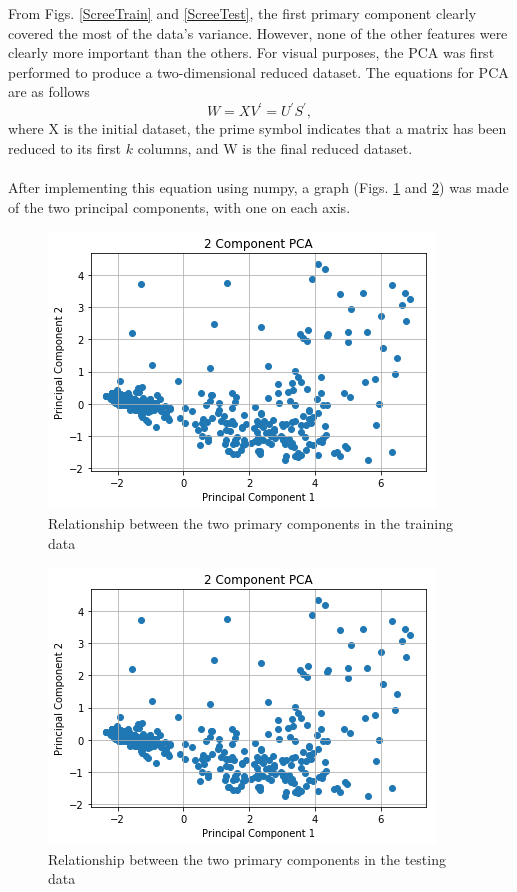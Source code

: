 \documentclass[12pt]{article}
\begin{document}
    From Figs. \ref{ScreeTrain} and \ref{ScreeTest}, the first primary component clearly covered the most of the data's variance. However, none of the other features were clearly more important than the others. For visual purposes, the PCA was first performed to produce a two-dimensional reduced dataset. The equations for PCA are as follows
    \begin{equation}
    W = XV^\prime = U^\prime S^\prime,
    \end{equation}
    where X is the initial dataset, the prime symbol indicates that a matrix has been reduced to its first $k$ columns, and W is the final reduced dataset.
    \paragraph{} 
    After implementing this equation using numpy, a graph (Figs. \ref{PCATrain} and \ref{PCATest}) was made of the two principal components, with one on each axis. 
    \begin{center}
        \begin{figure}[H]
    	    \includegraphics[width=0.75\linewidth]{Pictures/pcatrain.png}
        	\caption{Relationship between the two primary components in the training data}
    	    \label{PCATrain}
        \end{figure}
    \end{center}
    \begin{center}
    	\begin{figure}[H]
    		\includegraphics[width=0.75\linewidth]{Pictures/pcatest.png}
    		\caption{Relationship between the two primary components in the testing data}
    		\label{PCATest}
    	\end{figure}
    \end{center}
\end{document}
